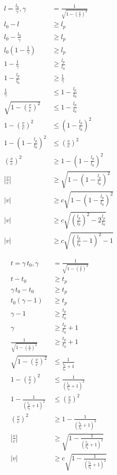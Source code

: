 \documentclass[pagesize,headsepline,10pt,parskip=half,BCOR=12mm]{scrreprt}
\begin{document}
  \begin{align*}
    l = \frac{l_0}{\gamma}, \gamma &= \frac{1}{\sqrt{1 - \left(\frac{v}{c}\right)^2}}\\
    l_0 - l &\geq l_p \\
    l_0 - \frac{l_0}{\gamma} &\geq l_p \\
    l_0 \left(1 - \frac{1}{\gamma}\right) &\geq l_p \\
    1 - \frac{1}{\gamma} &\geq \frac{l_p}{l_0} \\
    1 - \frac{l_p}{l_0} &\geq \frac{1}{\gamma} \\
    \frac{1}{\gamma} &\leq 1 - \frac{l_p}{l_0} \\
    \sqrt{1 - \left(\frac{v}{c}\right)^2} &\leq 1 - \frac{l_p}{l_0} \\
    1 - \left(\frac{v}{c}\right)^2 &\leq \left( 1 - \frac{l_p}{l_0} \right)^2 \\
    1 - \left( 1 - \frac{l_p}{l_0} \right)^2 &\leq \left(\frac{v}{c}\right)^2 \\
    \left(\frac{v}{c}\right)^2 &\geq 1 - \left( 1 - \frac{l_p}{l_0} \right)^2 \\
    \left\lvert \frac{v}{c} \right\rvert &\geq \sqrt{1 - \left( 1 - \frac{l_p}{l_0} \right)^2} \\
    \left\lvert v \right\rvert &\geq c \sqrt{1 - \left( 1 - \frac{l_p}{l_0} \right)^2} \\
    \left\lvert v \right\rvert &\geq c \sqrt{\left( \frac{l_p}{l_0} \right)^2 - 2\frac{l_p}{l_0}} \\
    \left\lvert v \right\rvert &\geq c \sqrt{\left( \frac{l_p}{l_0} - 1 \right)^2 - 1}
  \end{align*}
  
  \begin{align*}
    t = \gamma\,t_0, \gamma &= \frac{1}{\sqrt{1 - \left(\frac{v}{c}\right)^2}}\\
    t - t_0 &\geq t_p \\
    \gamma\,t_0 - t_0 &\geq t_p \\
    t_0 \left( \gamma - 1 \right) &\geq t_p \\
    \gamma - 1 &\geq \frac{t_p}{t_0} \\
    \gamma &\geq \frac{t_p}{t_0} + 1 \\
    \frac{1}{\sqrt{1 - \left( \frac{v}{c} \right)^2}} &\geq \frac{t_p}{t_0} + 1 \\
    \sqrt{1 - \left( \frac{v}{c} \right)^2} &\leq \frac{1}{\frac{t_p}{t_0} + 1} \\
    1 - \left( \frac{v}{c} \right)^2 &\leq \frac{1}{\left( \frac{t_p}{t_0} + 1 \right)^2} \\
    1 - \frac{1}{\left( \frac{t_p}{t_0} + 1 \right)^2} &\leq \left( \frac{v}{c} \right)^2 \\
    \left( \frac{v}{c} \right)^2 &\geq 1 - \frac{1}{\left( \frac{t_p}{t_0} + 1 \right)^2} \\
    \left\lvert \frac{v}{c} \right\rvert &\geq \sqrt{1 - \frac{1}{\left( \frac{t_p}{t_0} + 1 \right)^2}} \\
    \left\lvert v \right\rvert &\geq c \sqrt{1 - \frac{1}{\left( \frac{t_p}{t_0} + 1 \right)^2}} \\
  \end{align*}
\end{document}

